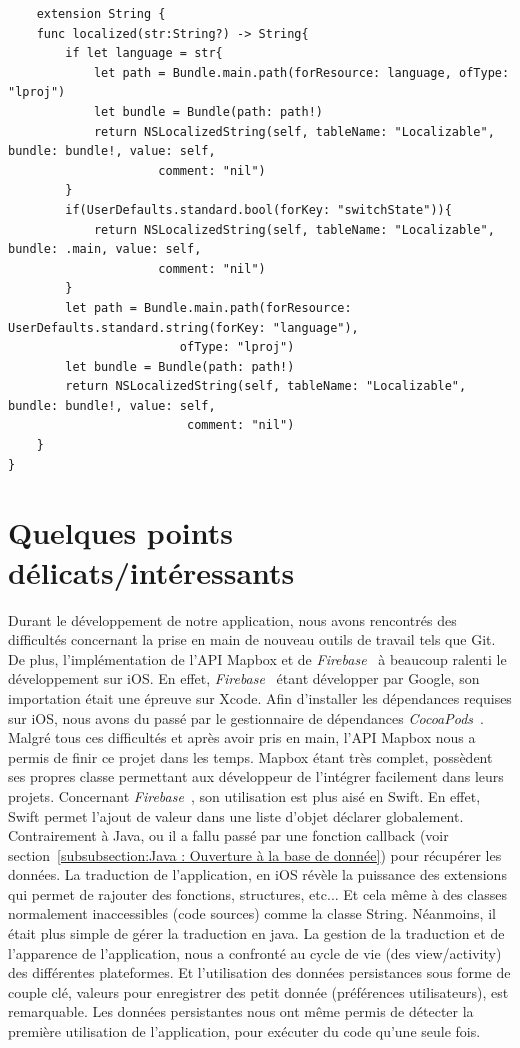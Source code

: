 \documentclass{article}
\begin{document}
\begin{verbatim}
    extension String {
    func localized(str:String?) -> String{
        if let language = str{
            let path = Bundle.main.path(forResource: language, ofType: "lproj")
            let bundle = Bundle(path: path!)
            return NSLocalizedString(self, tableName: "Localizable", bundle: bundle!, value: self,
            		 comment: "nil")
        }
        if(UserDefaults.standard.bool(forKey: "switchState")){
            return NSLocalizedString(self, tableName: "Localizable", bundle: .main, value: self,
            		 comment: "nil")
        }
        let path = Bundle.main.path(forResource: UserDefaults.standard.string(forKey: "language"), 
        				ofType: "lproj")
        let bundle = Bundle(path: path!)
        return NSLocalizedString(self, tableName: "Localizable", bundle: bundle!, value: self,
        				 comment: "nil")
    }
}  
\end{verbatim}


\newpage %


\section{Quelques points délicats/intéressants}

Durant le développement de notre application, nous avons rencontrés des difficultés concernant la prise en main
de nouveau outils de travail tels que Git.
De plus, l'implémentation de l'API Mapbox et de \textit{Firebase}~\cite{firebaseDoc} à beaucoup ralenti
le développement sur iOS. En effet, \textit{Firebase}~\cite{firebaseDoc} étant développer par Google, son importation
était une épreuve sur Xcode. Afin d'installer les dépendances requises sur iOS, nous avons du passé par
le gestionnaire de dépendances \textit{CocoaPods}~\cite{cocoapodsDoc}.
Malgré tous ces difficultés et après avoir pris en main, l'API Mapbox nous a permis de finir ce projet dans les temps.
Mapbox étant très complet, possèdent ses propres classe permettant aux développeur de l'intégrer facilement dans leurs
projets.
Concernant \textit{Firebase}~\cite{firebaseDoc}, son utilisation est plus aisé en Swift. En effet, Swift permet
l'ajout de valeur dans une liste d'objet déclarer globalement. Contrairement à Java, ou il a fallu passé par une
fonction callback (voir section~\ref{subsubsection:Java : Ouverture à la base de donnée}) pour récupérer les données.
La traduction de l'application, en iOS révèle la puissance des extensions qui permet de rajouter des fonctions, structures, etc... Et cela même à des classes normalement inaccessibles (code sources) comme la classe String. Néanmoins, il était plus simple de gérer la traduction en java. La gestion de la traduction et de l'apparence de l'application, nous a confronté au cycle de vie (des view/activity) des différentes plateformes. Et l'utilisation des données persistances sous forme de couple clé, valeurs pour enregistrer des petit donnée (préférences utilisateurs), est remarquable.  Les données persistantes nous ont même permis de détecter la première utilisation de l'application, pour exécuter du code qu'une seule fois.
\end{document}
